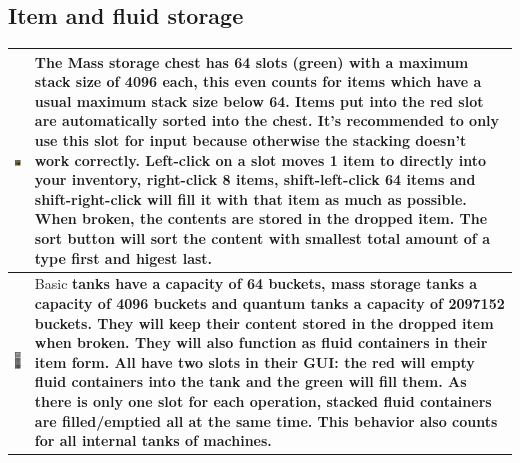 \documentclass[11pt]{article} %
\makeatletter
\newcommand{\imgtex}{\begin{tabularx}{\textwidth}{@{}c@{ }X@{}}}
\makeatother
\begin{document}
\subsection{Item and fluid storage}
\imgtex \hline
\includegraphics[align = t]{blockMassstorage} & The \bf Mass storage chest \rm has 64 slots (green) with a maximum stack size of 4096 each, this even counts for items which have a usual maximum stack size below 64. Items put into the red slot are automatically sorted into the chest. It's recommended to only use this slot for input because otherwise the stacking doesn't work correctly. Left-click on a slot moves 1 item to directly into your inventory, right-click 8 items, shift-left-click 64 items and shift-right-click will fill it with that item as much as possible. When broken, the contents are stored in the dropped item. The sort button will sort the content with smallest total amount of a type first and higest last. \\ \hline
\includegraphics[align = t]{blockTanks} & Basic \bf tanks \rm have a capacity of 64 buckets, \bf mass storage tanks \rm a capacity of 4096 buckets and \bf quantum tanks \rm a capacity of 2097152 buckets. They will keep their content stored in the dropped item when broken. They will also function as fluid containers in their item form. All have two slots in their GUI: the red will empty fluid containers into the tank and the green will fill them. As there is only one slot for each operation, stacked fluid containers are filled/emptied all at the same time. This behavior also counts for all internal tanks of machines.\\ \hline
\end{tabularx} \\\\
\end{document}
